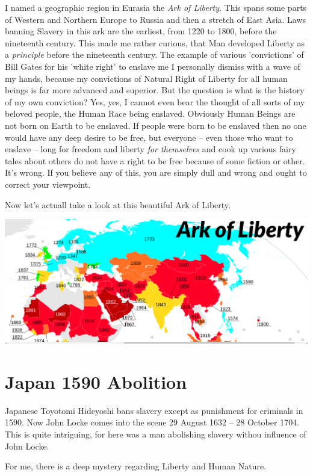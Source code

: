 \documentclass{amsart}
\begin{document}
I named a geographic region in Eurasia the {\em Ark of Liberty}.  This spans some parts of Western and Northern Europe to Russia and then a stretch of East Asia.  Laws banning Slavery in this ark are the earliest, from 1220 to 1800, before the nineteenth century.  This made me rather curious, that Man developed Liberty as a {\em principle} before the nineteenth century.  The example of various 'convictions' of Bill Gates for his 'white right' to enslave me I personally dismiss with a wave of my hands, because my convictions of Natural Right of Liberty for all human beings is far more advanced and superior.  But the question is what is the history of my own conviction?  Yes, yes, I cannot even bear the thought of all sorts of my beloved people, the Human Race being enslaved.  Obviously Human Beings are not born on Earth to be enslaved.  If people were born to be enslaved then no one would have any deep desire to be free, but everyone -- even those who want to enslave -- long for freedom and liberty {\em for themselves} and cook up various fairy tales about others do not have a right to be free because of some fiction or other.  It's wrong.  If you believe any of this, you are simply dull and wrong and ought to correct your viewpoint.

Now let's actuall take a look at this beautiful Ark of Liberty.

\includegraphics[scale=
0.2]{libertyark.png}

\section{Japan 1590 Abolition}

Japanese Toyotomi Hideyoshi bans slavery except as punishment for criminals in 1590.  Now John Locke comes into the scene 29 August 1632 – 28 October 1704.  This is quite intriguing, for here was a man abolishing slavery withou influence of John Locke.

For me, there is a deep mystery regarding Liberty and Human Nature.  
\end{document}
